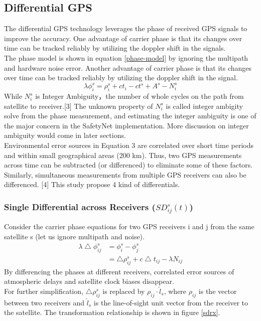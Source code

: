 \documentclass[journal,onecolumn]{IEEEtran}
\begin{document}
\subsection{Differential GPS}
The differential GPS technology leverages the phase of received GPS signals to improve
the accuracy. One advantage of carrier phase is that its changes over time can
be tracked reliably by utilizing the doppler shift in the signals.\\
The phase model is shown in equation \ref{phase-model} by ignoring the
multipath and hardware noise error. Another advantage of carrier phase is that its changes over time can be tracked reliably by utilizing the doppler shift in the signal.
\begin{equation}
  \lambda\phi_i^s = \rho_i^s + ct_i - ct^s + A^s - N_i^s
  \label{phase-model}
\end{equation}
While $N_i^s$ is Integer Ambiguity，the number of whole cycles on the path from satellite to receiver.[3] The unknown property of $N_i^s$ is called integer ambigity
solve from the phase measurement, and estimating the integer ambiguity is one of the major
concern in the SafetyNet implementation. More discussion on integer ambiguity
would come in later sections.\\
Environmental error sources in Equation 3 are correlated over short time periods
and within small geographical areas (200 km). Thus, two GPS measurements across
time can be subtracted (or differenced) to eliminate some of these factors.
Similarly, simultaneous measurements from multiple GPS receivers can also be
differenced. [4] This study propose 4 kind of differentials.
\subsubsection{Single Differential across Receivers ($SD_{ij}^s(t)$)}

Consider the carrier phase equations for two GPS receivers i and j from the same satellite s (let us ignore multipath and noise).
\begin{equation}
  \begin{split}
    \lambda \bigtriangleup \phi_{ij}^s &= \phi_{i}^s - \phi_{j}^s\\
    &= \bigtriangleup \rho_{ij}^s + c\bigtriangleup t_{ij} - \lambda N_{ij}
  \end{split}
\end{equation}
By differencing the phases at different receivers, correlated error sources of
atmospheric delays and satellite clock biases disappear. \\
For further simplification, $\bigtriangleup \rho_{ij}^s$ is replaced by $\rho_{ij}\cdot \hat{l}_s$,
where $\rho_{ij}$ is the vector between two receivers and $\hat{l}_s$ is the
line-of-sight unit vector from the receiver to the satellite. The transformation
relationship is shown in figure \ref{sdrx}.
\end{document}
